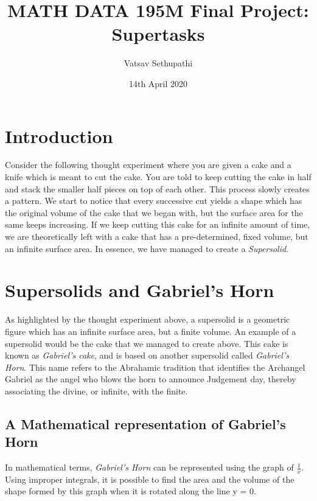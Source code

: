 \documentclass{article}
\title{MATH DATA 195M Final Project: Supertasks}
\author{Vatsav Sethupathi}
\date{14th April 2020}
\begin{document}
\maketitle

\section{Introduction}
Consider the following thought experiment where you are given a cake and a knife which is meant to cut the cake. You are told to keep cutting the cake in half and stack the smaller half pieces on top of each other. This process slowly creates a pattern. We start to notice that every successive cut yields a shape which has the original volume of the cake that we began with, but the surface area for the same keeps increasing. If we keep cutting this cake for an infinite amount of time, we are theoretically left with a cake that has a pre-determined, fixed volume, but an infinite surface area. In essence, we have managed to create a \textsl{Supersolid}.

\section{Supersolids and Gabriel's Horn}
As highlighted by the thought experiment above, a supersolid is a geometric figure which has an infinite surface area, but a finite volume. An example of a supersolid would be the cake that we managed to create above. This cake is known as \textsl{Gabriel’s cake}, and is based on another supersolid called \textsl{Gabriel’s Horn}. This name refers to the Abrahamic tradition that identifies the Archangel Gabriel as the angel who blows the horn to announce Judgement day, thereby associating the divine, or infinite, with the finite.\cite{Wikipedia}

\subsection{A Mathematical representation of Gabriel's Horn}
In mathematical terms, \textsl{Gabriel’s Horn} can be represented using the graph of $\frac{1}{x}$. Using improper integrals, it is possible to find the area and the volume of the shape formed by this graph when it is rotated along the line y = 0. \cite{Wolfram}
\end{document}
